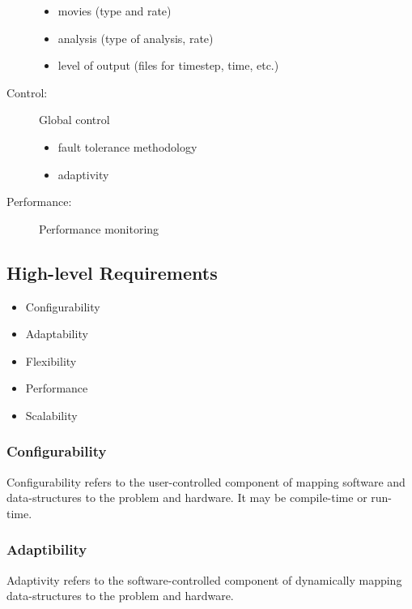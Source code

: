 \documentclass{article}
\begin{document}
\begin{description}
\begin{itemize}
\item movies (type and rate)
\item analysis (type of analysis, rate)
\item level of output (files for timestep, time, etc.)
\end{itemize}
\item[Control: ] Global control
\begin{itemize}
\item fault tolerance methodology
\item adaptivity
\end{itemize}
\item[Performance: ] Performance monitoring
\end{description}




\subsection{High-level Requirements}

\begin{itemize}
\item Configurability
\item Adaptability
\item Flexibility
\item Performance
\item Scalability
\end{itemize}


\subsubsection{Configurability}

   Configurability refers to the user-controlled component of
   mapping software and data-structures to the problem and hardware.
   It may be compile-time or run-time.

\subsubsection{Adaptibility}

   Adaptivity refers to the software-controlled component of
   dynamically mapping data-structures to the problem and
   hardware.
 
\end{document}
